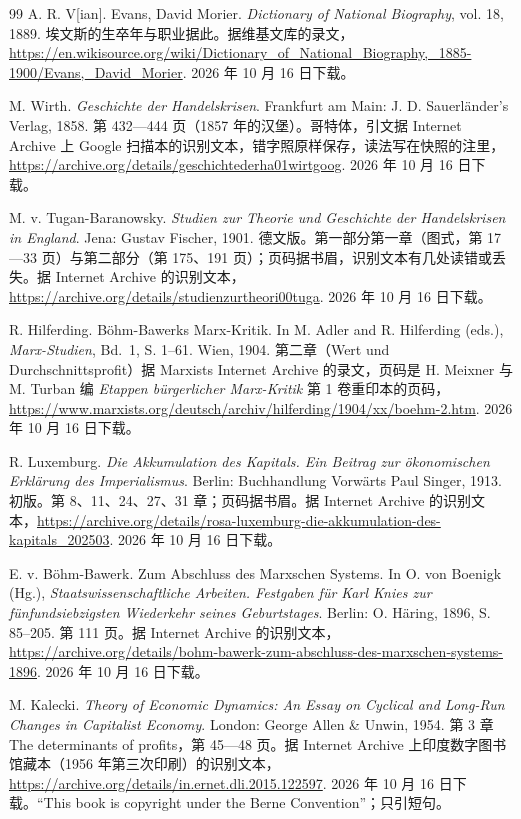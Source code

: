 \begin{thebibliography}{99}
 A. R. V[ian]. Evans, David Morier. \emph{Dictionary of National Biography}, vol. 18, 1889. 埃文斯的生卒年与职业据此。据维基文库的录文，\url{https://en.wikisource.org/wiki/Dictionary_of_National_Biography,_1885-1900/Evans,_David_Morier}. 2026 年 10 月 16 日下载。

 M. Wirth. \emph{Geschichte der Handelskrisen}. Frankfurt am Main: J. D. Sauerländer's Verlag, 1858. 第 432—444 页（1857 年的汉堡）。哥特体，引文据 Internet Archive 上 Google 扫描本的识别文本，错字照原样保存，读法写在快照的注里，\url{https://archive.org/details/geschichtederha01wirtgoog}. 2026 年 10 月 16 日下载。

 M. v. Tugan-Baranowsky. \emph{Studien zur Theorie und Geschichte der Handelskrisen in England}. Jena: Gustav Fischer, 1901. 德文版。第一部分第一章（图式，第 17—33 页）与第二部分（第 175、191 页）；页码据书眉，识别文本有几处读错或丢失。据 Internet Archive 的识别文本，\url{https://archive.org/details/studienzurtheori00tuga}. 2026 年 10 月 16 日下载。

 R. Hilferding. Böhm-Bawerks Marx-Kritik. In M. Adler and R. Hilferding (eds.), \emph{Marx-Studien}, Bd.~1, S. 1--61. Wien, 1904. 第二章（Wert und Durchschnittsprofit）据 Marxists Internet Archive 的录文，页码是 H. Meixner 与 M. Turban 编 \emph{Etappen bürgerlicher Marx-Kritik} 第 1 卷重印本的页码，\url{https://www.marxists.org/deutsch/archiv/hilferding/1904/xx/boehm-2.htm}. 2026 年 10 月 16 日下载。

 R. Luxemburg. \emph{Die Akkumulation des Kapitals. Ein Beitrag zur ökonomischen Erklärung des Imperialismus}. Berlin: Buchhandlung Vorwärts Paul Singer, 1913. 初版。第 8、11、24、27、31 章；页码据书眉。据 Internet Archive 的识别文本，\url{https://archive.org/details/rosa-luxemburg-die-akkumulation-des-kapitals_202503}. 2026 年 10 月 16 日下载。

 E. v. Böhm-Bawerk. Zum Abschluss des Marxschen Systems. In O. von Boenigk (Hg.), \emph{Staatswissenschaftliche Arbeiten. Festgaben für Karl Knies zur fünfundsiebzigsten Wiederkehr seines Geburtstages}. Berlin: O. Häring, 1896, S. 85--205. 第 111 页。据 Internet Archive 的识别文本，\url{https://archive.org/details/bohm-bawerk-zum-abschluss-des-marxschen-systems-1896}. 2026 年 10 月 16 日下载。

 M. Kalecki. \emph{Theory of Economic Dynamics: An Essay on Cyclical and Long-Run Changes in Capitalist Economy}. London: George Allen \& Unwin, 1954. 第 3 章 The determinants of profits，第 45—48 页。据 Internet Archive 上印度数字图书馆藏本（1956 年第三次印刷）的识别文本，\url{https://archive.org/details/in.ernet.dli.2015.122597}. 2026 年 10 月 16 日下载。“This book is copyright under the Berne Convention”；只引短句。


\end{thebibliography}

